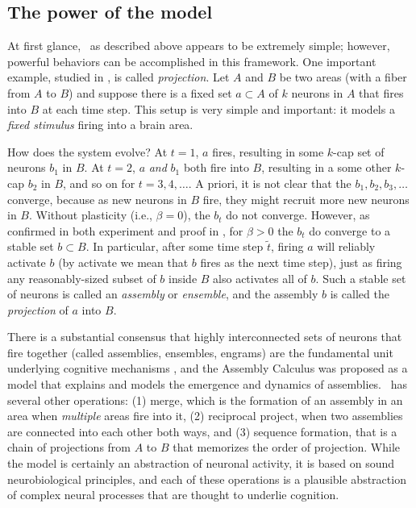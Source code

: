 \documentclass{article}
\begin{document}
\subsection*{The power of the model} 
At first glance, \name\ as described above appears to be extremely simple; however, powerful behaviors can be accomplished in this framework. One important example, studied in \cite{PNAS}, is called \emph{projection}. Let $A$ and $B$ be two areas (with a fiber from $A$ to $B$) and suppose there is a fixed set $a \subset A$ of $k$ neurons in $A$ that fires into $B$ at each time step. This setup is very simple and important: it models a \emph{fixed stimulus} firing into a brain area. 

How does the system evolve? At $t=1$, $a$ fires, resulting in some $k$-cap set of neurons $b_1$ in $B$. At $t = 2$, $a$ \emph{and} $b_1$ both fire into $B$, resulting in a some other $k$-cap $b_2$ in $B$, and so on for $t=3,4,\ldots$. A priori, it is not clear that the $b_1,b_2,b_3,\ldots$ converge, because as new neurons in $B$ fire, they might recruit more new neurons in $B$. Without plasticity (i.e., $\beta = 0$), the $b_t$ do not converge. However, as confirmed in both experiment and proof in \cite{PNAS}, for $\beta > 0$ the $b_t$ do converge to a stable set $b \subset B$. In particular, after some time step $\tilde{t}$, firing $a$ will reliably activate $b$ (by activate we mean that $b$ fires as the next time step), just as firing any reasonably-sized subset of $b$ inside $B$ also activates all of $b$. Such a stable set of neurons is called an \emph{assembly} or \emph{ensemble}, and the assembly $b$ is called the \emph{projection} of $a$ into $B$. 

There is a substantial consensus that highly interconnected sets of neurons that fire together (called assemblies, ensembles, engrams) are the fundamental unit underlying cognitive mechanisms \cite{Buzsaki:10}, and the Assembly Calculus was proposed as a model that explains and models the emergence and dynamics of assemblies. \name\ has several other operations: (1) merge, which is the formation of an assembly in an area when \emph{multiple} areas fire into it, (2) reciprocal project, when two assemblies are connected into each other both ways, and (3) sequence formation, that is a chain of projections from $A$ to $B$ that memorizes the order of projection. While the model is certainly an abstraction of neuronal activity, it is based on sound neurobiological principles, and each of these operations is a plausible abstraction of complex neural processes that are thought to underlie cognition.
\end{document}
